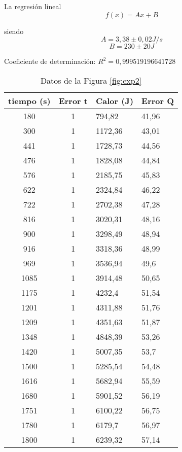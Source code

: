 \documentclass[a4paper,12pt,spanish]{article}
\begin{document}
	
	
	La regresión lineal
	\[f(x) = Ax + B
	\]
	
	siendo 
	\[ A = 3,38 \pm 0,02 \si{J/s}
	\]
	\[B = 230 \pm 20\si{J}
	\]
	
	Coeficiente de determinación: $R^2 = 0,999519196641728$
	 
	
	
	
	
	
	\begin{table}[H]
		\centering
		\begin{tabular}{|c|c|l|l|}
			\hline
			tiempo (s)  & Error t & Calor (J)  & Error Q\\ \hline\hline
			180  & 1 & 794,82  & 41,96 \\ \hline
			300  & 1 & 1172,36 & 43,01 \\ \hline
			441  & 1 & 1728,73 & 44,56 \\ \hline
			476  & 1 & 1828,08 & 44,84 \\ \hline
			576  & 1 & 2185,75 & 45,83 \\ \hline
			622  & 1 & 2324,84 & 46,22 \\ \hline
			722  & 1 & 2702,38 & 47,28 \\ \hline
			816  & 1 & 3020,31 & 48,16 \\ \hline
			900  & 1 & 3298,49 & 48,94 \\ \hline
			916  & 1 & 3318,36 & 48,99 \\ \hline
			969  & 1 & 3536,94 & 49,6  \\ \hline
			1085 & 1 & 3914,48 & 50,65 \\ \hline
			1175 & 1 & 4232,4  & 51,54 \\ \hline
			1201 & 1 & 4311,88 & 51,76 \\ \hline
			1209 & 1 & 4351,63 & 51,87 \\ \hline
			1348 & 1 & 4848,39 & 53,26 \\ \hline
			1420 & 1 & 5007,35 & 53,7  \\ \hline
			1500 & 1 & 5285,54 & 54,48 \\ \hline
			1616 & 1 & 5682,94 & 55,59 \\ \hline
			1680 & 1 & 5901,52 & 56,19 \\ \hline
			1751 & 1 & 6100,22 & 56,75 \\ \hline
			1780 & 1 & 6179,7  & 56,97 \\ \hline
			1800 & 1 & 6239,32 & 57,14 \\ \hline
		\end{tabular}
		\caption{Datos de la Figura \ref{fig:exp2}}
		\label{tab:fig2exp2}
	\end{table}
	
\end{document}
